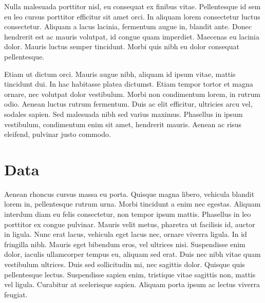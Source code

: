\documentclass[linenumbers,RNAAS,trackchanges]{aastex631}
\begin{document}
Nulla malesuada porttitor nisl, eu consequat ex finibus vitae. Pellentesque id sem eu leo cursus porttitor efficitur sit amet orci. In aliquam lorem consectetur luctus consectetur. Aliquam a lacus lacinia, fermentum augue in, blandit ante. Donec hendrerit est ac mauris volutpat, id congue quam imperdiet. Maecenas eu lacinia dolor. Mauris luctus semper tincidunt. Morbi quis nibh eu dolor consequat pellentesque.

Etiam ut dictum orci. Mauris augue nibh, aliquam id ipsum vitae, mattis tincidunt dui. In hac habitasse platea dictumst. Etiam tempor tortor et magna ornare, nec volutpat dolor vestibulum. Morbi non condimentum lorem, in rutrum odio. Aenean luctus rutrum fermentum. Duis ac elit efficitur, ultricies arcu vel, sodales sapien. Sed malesuada nibh sed varius maximus. Phasellus in ipsum vestibulum, condimentum enim sit amet, hendrerit mauris. Aenean ac risus eleifend, pulvinar justo commodo.

\section{Data} \label{sec:data}
Aenean rhoncus cursus massa eu porta. Quisque magna libero, vehicula blandit lorem in, pellentesque rutrum urna. Morbi tincidunt a enim nec egestas. Aliquam interdum diam eu felis consectetur, non tempor ipsum mattis. Phasellus in leo porttitor ex congue pulvinar. Mauris velit metus, pharetra ut facilisis id, auctor in ligula. Nunc erat lacus, vehicula eget lacus nec, ornare viverra ligula. In id fringilla nibh. Mauris eget bibendum eros, vel ultrices nisi. Suspendisse enim dolor, iaculis ullamcorper tempus eu, aliquam sed erat. Duis nec nibh vitae quam vestibulum ultrices. Duis sed sollicitudin mi, nec sagittis dolor. Quisque quis pellentesque lectus. Suspendisse sapien enim, tristique vitae sagittis non, mattis vel ligula. Curabitur at scelerisque sapien. Aliquam porta ipsum ac lectus viverra feugiat.
\end{document}
